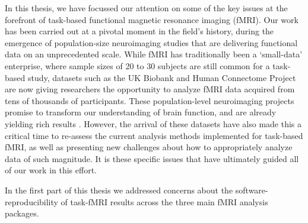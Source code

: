 In this thesis, we have focussed our attention on some of the key issues at the forefront of task-based functional magnetic resonance imaging (fMRI). Our work has been carried out at a pivotal moment in the field's history, during the emergence of population-size neuroimaging studies that are delivering functional data on an unprecedented scale. While fMRI has traditionally been a `small-data' enterprise, where sample sizes of 20 to 30 subjects are still common for a task-based study, datasets such as the UK Biobank and Human Connectome Project are now giving researchers the opportunity to analyze fMRI data acquired from tens of thousands of participants. These population-level neuroimaging projects promise to transform our understanding of brain function, and are already yielding rich results \citep{Miller2016-hd, David_C_Van_Essen2016-bt}. However, the arrival of these datasets have also made this a critical time to re-assess the current analysis methods implemented for task-based fMRI, as well as presenting new challenges about how to appropriately analyze data of such magnitude. It is these specific issues that have ultimately guided all of our work in this effort. 

In the first part of this thesis we addressed concerns about the software-reproducibility of task-fMRI results across the three main fMRI analysis packages. 